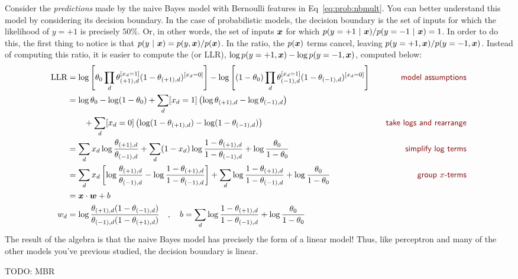 Consider the \emph{predictions} made by the naive Bayes model with
Bernoulli features in Eq~\eqref{eq:prob:nbmult}.  You can better
understand this model by considering its decision boundary.  In the
case of probabilistic models, the decision boundary is the set of
inputs for which the likelihood of $y=+1$ is precisely $50\%$.  Or, in
other words, the set of inputs ${\boldsymbol{x}}$ for which $p(y=+1 \textrm{~}\arrowvert\textrm{~} {\boldsymbol{x}}) /
p(y=-1 \textrm{~}\arrowvert\textrm{~} {\boldsymbol{x}}) = 1$.  In order to do this, the first thing to notice
is that $p(y \textrm{~}\arrowvert\textrm{~} {\boldsymbol{x}}) = p(y,{\boldsymbol{x}}) / p({\boldsymbol{x}})$.  In the ratio, the $p({\boldsymbol{x}})$
terms cancel, leaving $p(y=+1,{\boldsymbol{x}}) / p(y=-1,{\boldsymbol{x}})$.  Instead of
computing this ratio, it is easier to compute the
 (or LLR), $\log p(y=+1,{\boldsymbol{x}}) - \log
p(y=-1,{\boldsymbol{x}})$, computed below:
%
\begin{align}
\text{LLR}
&= \log \left[ \th_0 \prod_d \th_{(+1),d}^{[x_d=1]} (1-\th_{(+1),d})^{[x_d=0]} \right]
 - \log \left[ (1-\th_0) \prod_d \th_{(-1),d}^{[x_d=1]} (1-\th_{(-1),d})^{[x_d=0]} \right]
   \becauseof{model assumptions} \\
&= \log \th_0 - \log (1-\th_0)  + \sum_d [x_d=1] \left( \log \th_{(+1),d} - \log \th_{(-1),d} \right) \nonumber\\
&\qquad+ \sum_d [x_d=0] \left( \log (1-\th_{(+1),d}) - \log (1-\th_{(-1),d}) \right)
   \becauseof{take logs and rearrange} \\
&= \sum_d x_d \log \frac {\th_{(+1),d}} {\th_{(-1),d}}
 + \sum_d (1-x_d) \log \frac {1-\th_{(+1),d}} {1-\th_{(-1),d}}
 + \log \frac {\th_0} {1-\th_0}
    \becauseof{simplify log terms} \\
&= \sum_d x_d \left[ \log \frac {\th_{(+1),d}} {\th_{(-1),d}} - \log \frac {1-\th_{(+1),d}} {1-\th_{(-1),d}} \right]
 + \sum_d \log \frac {1-\th_{(+1),d}} {1-\th_{(-1),d}}
 + \log \frac {\th_0} {1-\th_0}
    \becauseof{group $x$-terms} \\
&= \dotp{\vx}{\vw} + b \\
w_d &= \log \frac {\th_{(+1),d} (1-\th_{(-1),d})} {\th_{(-1),d} (1-\th_{(+1),d})}
\quad,\quad
b   = \sum_d \log \frac {1-\th_{(+1),d}} {1-\th_{(-1),d}}
 + \log \frac {\th_0} {1-\th_0} 
\end{align}
%
The result of the algebra is that the naive Bayes model has precisely
the form of a linear model!  Thus, like perceptron and many of the
other models you've previous studied, the decision boundary is linear.

TODO: MBR

